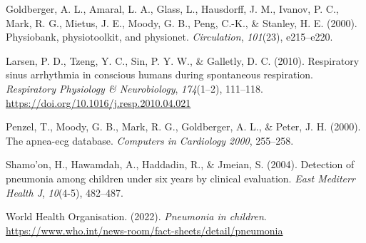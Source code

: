 \documentclass[
]{article}
\newlength{\cslhangindent}
\newlength{\cslentryspacingunit} %
\newenvironment{CSLReferences}[2] %
 {%
  \setlength{\parindent}{0pt}
  \ifodd #1
  \let\oldpar\par
  \def\par{\hangindent=\cslhangindent\oldpar}
  \fi
  \setlength{\parskip}{#2\cslentryspacingunit}
 }%
 {}
\begin{document}
\hypertarget{refs}{}
\begin{CSLReferences}{1}{1}
\leavevmode{}%
Goldberger, A. L., Amaral, L. A., Glass, L., Hausdorff, J. M., Ivanov,
P. C., Mark, R. G., Mietus, J. E., Moody, G. B., Peng, C.-K., \&
Stanley, H. E. (2000). Physiobank, physiotoolkit, and physionet.
\emph{Circulation}, \emph{101}(23), e215--e220.

\leavevmode{}%
Larsen, P. D., Tzeng, Y. C., Sin, P. Y. W., \& Galletly, D. C. (2010).
Respiratory sinus arrhythmia in conscious humans during spontaneous
respiration. \emph{Respiratory Physiology \& Neurobiology},
\emph{174}(1--2), 111--118.
\url{https://doi.org/10.1016/j.resp.2010.04.021}

\leavevmode{}%
Penzel, T., Moody, G. B., Mark, R. G., Goldberger, A. L., \& Peter, J.
H. (2000). The apnea-ecg database. \emph{Computers in Cardiology 2000},
255--258.

\leavevmode{}%
Shamo'on, H., Hawamdah, A., Haddadin, R., \& Jmeian, S. (2004).
Detection of pneumonia among children under six years by clinical
evaluation. \emph{East Mediterr Health J}, \emph{10}(4-5), 482--487.

\leavevmode{}%
World Health Organisation. (2022). \emph{Pneumonia in children}.
\url{https://www.who.int/news-room/fact-sheets/detail/pneumonia}

\end{CSLReferences}
\end{document}
